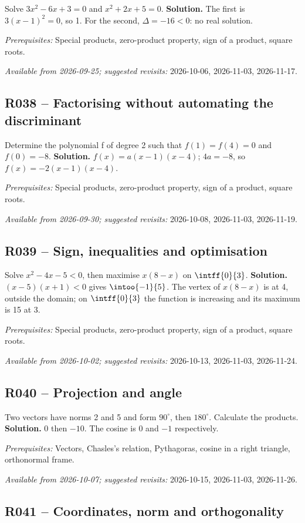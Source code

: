 Solve $3x^2-6x+3=0$ and $x^2+2x+5=0$.
\ifmxteacher\textbf{Solution.} The first is $3(x-1)^2=0$, so 1. For the second, $\Delta=-16<0$: no real solution.\par\textit{Prerequisites:} Special products, zero-product property, sign of a product, square roots.\par\textit{Available from 2026-09-25; suggested revisits:} 2026-10-06, 2026-11-03, 2026-11-17.\fi
{}\subsection*{R038 -- Factorising without automating the discriminant}\label{R038}
Determine the polynomial f of degree 2 such that $f(1)=f(4)=0$ and $f(0)=-8$.
\ifmxteacher\textbf{Solution.} $f(x)=a(x-1)(x-4)$; $4a=-8$, so $f(x)=-2(x-1)(x-4)$.\par\textit{Prerequisites:} Special products, zero-product property, sign of a product, square roots.\par\textit{Available from 2026-09-30; suggested revisits:} 2026-10-08, 2026-11-03, 2026-11-19.\fi
{}\subsection*{R039 -- Sign, inequalities and optimisation}\label{R039}
Solve $x^2-4x-5<0$, then maximise $x(8-x)$ on $\intff{0}{3}$.
\ifmxteacher\textbf{Solution.} $(x-5)(x+1)<0$ gives $\intoo{-1}{5}$. The vertex of $x(8-x)$ is at 4, outside the domain; on $\intff{0}{3}$ the function is increasing and its maximum is 15 at 3.\par\textit{Prerequisites:} Special products, zero-product property, sign of a product, square roots.\par\textit{Available from 2026-10-02; suggested revisits:} 2026-10-13, 2026-11-03, 2026-11-24.\fi
{}\subsection*{R040 -- Projection and angle}\label{R040}
Two vectors have norms 2 and 5 and form $90^\circ$, then $180^\circ$. Calculate the products.
\ifmxteacher\textbf{Solution.} $0$ then $-10$. The cosine is 0 and $-1$ respectively.\par\textit{Prerequisites:} Vectors, Chasles's relation, Pythagoras, cosine in a right triangle, orthonormal frame.\par\textit{Available from 2026-10-07; suggested revisits:} 2026-10-15, 2026-11-03, 2026-11-26.\fi
{}\subsection*{R041 -- Coordinates, norm and orthogonality}\label{R041}
